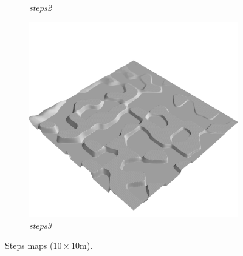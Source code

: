 \documentclass[../document.tex]{subfiles}
\begin{document}
\begin{figure}[H]
\begin{subfigure}[b]{0.32\linewidth}
            \caption{\emph{steps2}}
            \end{subfigure}    
          \begin{subfigure}[b]{0.32\textwidth}
            \includegraphics[width=\textwidth]{../img/hm3d/steps3.png}
            \caption{\emph{steps3}}
        \end{subfigure}    
    \caption{Steps maps ($10\times10$m).}
\end{figure}
\end{document}
